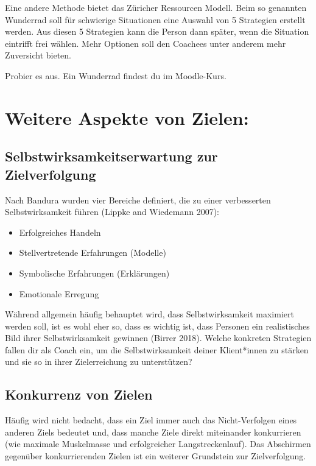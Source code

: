 \documentclass[
  letterpaper,
  DIV=11,
  numbers=noendperiod]{scrreprt}
\providecommand{\tightlist}{%
  \setlength{\itemsep}{0pt}\setlength{\parskip}{0pt}}
\begin{document}
Eine andere Methode bietet das Züricher Ressourcen Modell. Beim so
genannten Wunderrad soll für schwierige Situationen eine Auswahl von 5
Strategien erstellt werden. Aus diesen 5 Strategien kann die Person dann
später, wenn die Situation eintrifft frei wählen. Mehr Optionen soll den
Coachees unter anderem mehr Zuversicht bieten.

Probier es aus. Ein Wunderrad findest du im Moodle-Kurs.

\section{Weitere Aspekte von Zielen:}\label{weitere-aspekte-von-zielen}

\subsection{Selbstwirksamkeitserwartung zur
Zielverfolgung}\label{selbstwirksamkeitserwartung-zur-zielverfolgung}

Nach Bandura wurden vier Bereiche definiert, die zu einer verbesserten
Selbstwirksamkeit führen (Lippke and Wiedemann 2007):

\begin{itemize}
\tightlist
\item
  Erfolgreiches Handeln
\item
  Stellvertretende Erfahrungen (Modelle)
\item
  Symbolische Erfahrungen (Erklärungen)
\item
  Emotionale Erregung
\end{itemize}

Während allgemein häufig behauptet wird, dass Selbstwirksamkeit
maximiert werden soll, ist es wohl eher so, dass es wichtig ist, dass
Personen ein realistisches Bild ihrer Selbstwirksamkeit gewinnen (Birrer
2018). Welche konkreten Strategien fallen dir als Coach ein, um die
Selbstwirksamkeit deiner Klient*innen zu stärken und sie so in ihrer
Zielerreichung zu unterstützen?

\subsection{Konkurrenz von Zielen}\label{konkurrenz-von-zielen}

Häufig wird nicht bedacht, dass ein Ziel immer auch das Nicht-Verfolgen
eines anderen Ziels bedeutet und, dass manche Ziele direkt miteinander
konkurrieren (wie maximale Muskelmasse und erfolgreicher
Langstreckenlauf). Das Abschirmen gegenüber konkurrierenden Zielen ist
ein weiterer Grundstein zur Zielverfolgung.
\end{document}
